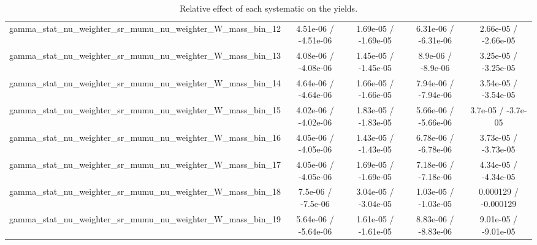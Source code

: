 \documentclass[10pt]{article}
\begin{document}
\begin{table}[htbp]
\begin{center}
\begin{tabular}{|c|c|c|c|c|}
  gamma_stat_nu_weighter_sr_mumu_nu_weighter_W_mass_bin_12 & 4.51e-06 / -4.51e-06 & 1.69e-05 / -1.69e-05 & 6.31e-06 / -6.31e-06 & 2.66e-05 / -2.66e-05 \\ 
  gamma_stat_nu_weighter_sr_mumu_nu_weighter_W_mass_bin_13 & 4.08e-06 / -4.08e-06 & 1.45e-05 / -1.45e-05 & 8.9e-06 / -8.9e-06 & 3.25e-05 / -3.25e-05 \\ 
  gamma_stat_nu_weighter_sr_mumu_nu_weighter_W_mass_bin_14 & 4.64e-06 / -4.64e-06 & 1.66e-05 / -1.66e-05 & 7.94e-06 / -7.94e-06 & 3.54e-05 / -3.54e-05 \\ 
  gamma_stat_nu_weighter_sr_mumu_nu_weighter_W_mass_bin_15 & 4.02e-06 / -4.02e-06 & 1.83e-05 / -1.83e-05 & 5.66e-06 / -5.66e-06 & 3.7e-05 / -3.7e-05 \\ 
  gamma_stat_nu_weighter_sr_mumu_nu_weighter_W_mass_bin_16 & 4.05e-06 / -4.05e-06 & 1.43e-05 / -1.43e-05 & 6.78e-06 / -6.78e-06 & 3.73e-05 / -3.73e-05 \\ 
  gamma_stat_nu_weighter_sr_mumu_nu_weighter_W_mass_bin_17 & 4.05e-06 / -4.05e-06 & 1.69e-05 / -1.69e-05 & 7.18e-06 / -7.18e-06 & 4.34e-05 / -4.34e-05 \\ 
  gamma_stat_nu_weighter_sr_mumu_nu_weighter_W_mass_bin_18 & 7.5e-06 / -7.5e-06 & 3.04e-05 / -3.04e-05 & 1.03e-05 / -1.03e-05 & 0.000129 / -0.000129 \\ 
  gamma_stat_nu_weighter_sr_mumu_nu_weighter_W_mass_bin_19 & 5.64e-06 / -5.64e-06 & 1.61e-05 / -1.61e-05 & 8.83e-06 / -8.83e-06 & 9.01e-05 / -9.01e-05 \\ 
\hline 
\end{tabular} 
\caption{Relative effect of each systematic on the yields.} 
\end{center} 
\end{table} 
\end{document}
